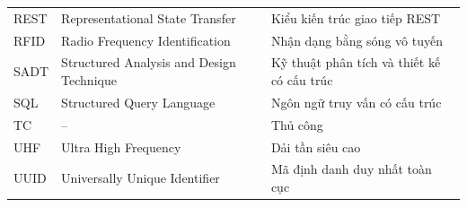 {\begin{longtable}{L{1.9cm} L{6.2cm} p{6.2cm}}
REST & Representational State Transfer & Kiểu kiến trúc giao tiếp REST \\
RFID & Radio Frequency Identification & Nhận dạng bằng sóng vô tuyến \\
SADT & Structured Analysis and Design Technique & Kỹ thuật phân tích và thiết kế có cấu trúc \\
SQL & Structured Query Language & Ngôn ngữ truy vấn có cấu trúc \\
TC & -- & Thủ công \\
UHF & Ultra High Frequency & Dải tần siêu cao \\
UUID & Universally Unique Identifier & Mã định danh duy nhất toàn cục \\
\bottomrule
\end{longtable}
}
